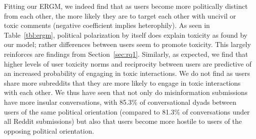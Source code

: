 Fitting our ERGM, we indeed find that as users become more politically distinct from each other, the more likely they are to target each other with uncivil or toxic comments (negative coefficient implies heterophily). As seen in Table~\ref{tbl:ergm}, political polarization by itself does explain toxicity as found by our model; rather differences between users seem to promote toxicity. This largely reinforces are findings from Section~\ref{sec:rq1}. Similarly, as expected, we find that higher levels of user toxicity norms and reciprocity between users are predictive of an increased probability of engaging in toxic interactions. We do not find as users share more subreddits that they are more likely to engage in toxic interactions with each other. 
We thus have seen that not only do misinformation submissions have more insular conversations, with 85.3\% of conversational dyads between users of the same political orientation (compared to 81.3\% of conversations under all Reddit submissions) but also that users become more hostile to users of the opposing political orientation.

